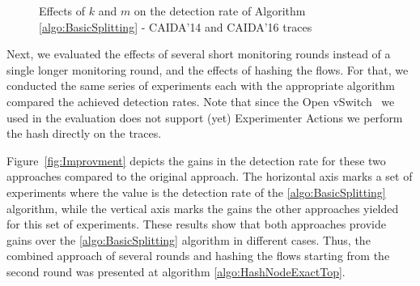 \begin{figure}
    \centering
    \caption{Effects of $k$ and $m$ on the detection rate of Algorithm \ref{algo:BasicSplitting} - CAIDA'14 and CAIDA'16 traces}
    \label{fig:kmBoth-DR1}

\end{figure}

Next, we evaluated the effects of several short monitoring rounds instead of a single longer monitoring round, and the effects of hashing the flows. For that, we conducted the same series of experiments each with the appropriate algorithm compared the achieved detection rates. Note that since the Open vSwitch~\cite{OVS} we used in the evaluation does not support (yet) Experimenter Actions we perform the hash directly on the traces.

Figure~\ref{fig:Improvment} depicts the gains in the detection rate for these two approaches compared to the original approach. The horizontal axis marks a set of experiments where the value is the detection rate of the \ref{algo:BasicSplitting} algorithm, while the vertical axis marks the gains the other approaches yielded for this set of experiments.
These results show that both approaches provide gains over the \ref{algo:BasicSplitting} algorithm in different cases. Thus, the combined approach of several rounds and hashing the flows starting from the second round was presented at algorithm \ref{algo:HashNodeExactTop}.

